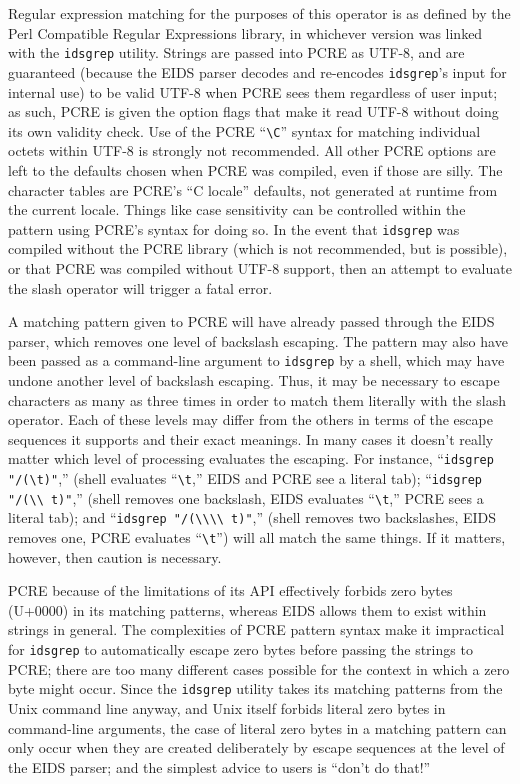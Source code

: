 \documentclass[twocolumn]{report}
\newcommand{\DangerousBend}{\marginpar{\large\hfill\dbend\hfill\null}}
\begin{document}
Regular \DangerousBend expression matching for the purposes of this operator
is as defined by the Perl Compatible Regular Expressions library, in
whichever version was linked with the \texttt{idsgrep} utility.  Strings are
passed into PCRE as UTF-8, and are guaranteed (because the EIDS parser
decodes and re-encodes \texttt{idsgrep}'s input for internal use) to be
valid UTF-8 when PCRE sees them regardless of user input; as such, PCRE is
given the option flags that make it read UTF-8 without doing its own
validity check.  Use of the PCRE ``\texttt{\textbackslash C}'' syntax for
matching individual octets within UTF-8 is strongly not recommended.  All
other PCRE options are left to the defaults chosen when PCRE was compiled,
even if those are silly.  The character tables are PCRE's ``C locale''
defaults, not generated at runtime from the current locale.  Things like
case sensitivity can be controlled within the pattern using PCRE's syntax
for doing so.  In the event that \texttt{idsgrep} was compiled without the
PCRE library (which is not recommended, but is possible), or that PCRE was
compiled without UTF-8 support, then an attempt to evaluate the slash
operator will trigger a fatal error.

A matching pattern given to PCRE will have already passed through the
EIDS parser, which removes one level of backslash escaping.  The
pattern may also have been passed as a command-line argument to
\texttt{idsgrep} by a shell, which may have undone another level of
backslash escaping.  Thus, it may be necessary to escape characters as
many as three times in order to match them literally with the slash
operator.  Each of these levels may differ from the others in terms of
the escape sequences it supports and their exact meanings.  In many
cases it doesn't really matter which level of processing
evaluates the escaping.  For instance, ``\texttt{idsgrep
"/(\textbackslash t)"},'' (shell
evaluates ``\texttt{\textbackslash t},'' EIDS and PCRE see a literal tab);
``\texttt{idsgrep "/(\textbackslash\textbackslash
t)"},'' (shell removes one backslash, EIDS evaluates
``\texttt{\textbackslash t},'' PCRE sees a literal tab); and ``\texttt{idsgrep
"/(\textbackslash\textbackslash\textbackslash\textbackslash
t)"},'' (shell removes two backslashes, EIDS removes
one, PCRE evaluates ``\texttt{\textbackslash t}'') will all match the same
things.  If it matters, however, then caution is necessary.

PCRE because of the limitations of its API effectively forbids zero bytes
(U+0000) in its matching patterns, whereas EIDS allows them to exist within
strings in general.  The complexities of PCRE pattern syntax make it
impractical for \texttt{idsgrep} to automatically escape zero bytes before
passing the strings to PCRE; there are too many different cases possible for
the context in which a zero byte might occur.  Since the \texttt{idsgrep}
utility takes its matching patterns from the Unix command line anyway, and
Unix itself forbids literal zero bytes in command-line arguments, the case
of literal zero bytes in a matching pattern can only occur when they are
created deliberately by escape sequences at the level of the EIDS parser;
and the simplest advice to users is ``don't do that!''
\end{document}
